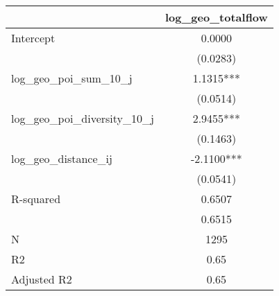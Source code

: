 \begin{table}
\caption{}
\begin{center}
\begin{tabular}{lc}
\hline
                                & log\_geo\_totalflow  \\
\midrule
Intercept                       & 0.0000               \\
                                & (0.0283)             \\
log\_geo\_poi\_sum\_10\_j       & 1.1315***            \\
                                & (0.0514)             \\
log\_geo\_poi\_diversity\_10\_j & 2.9455***            \\
                                & (0.1463)             \\
log\_geo\_distance\_ij          & -2.1100***           \\
                                & (0.0541)             \\
R-squared                       & 0.6507               \\
                                & 0.6515               \\
N                               & 1295                 \\
R2                              & 0.65                 \\
Adjusted R2                     & 0.65                 \\
\hline
\end{tabular}
\end{center}
\end{table}